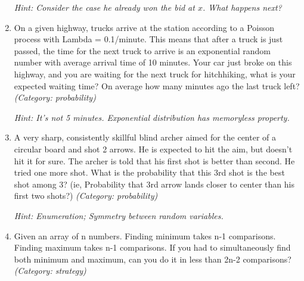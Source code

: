 \begin{enumerate}
\small\emph{Hint: Consider the case he already won the bid at $x$. What happens next?}





\item On a given highway, trucks arrive at the station according to a Poisson process with Lambda = 0.1/minute. This means that after a truck is just passed, the time for the next truck to arrive is an exponential random number with average arrival time of 10 minutes. Your car just broke on this highway, and you are waiting for the next truck for hitchhiking, what is your expected waiting time? On average how many minutes ago the last truck left?
\small\emph{(Category: probability)}

\small\emph{Hint: It's not 5 minutes. Exponential distribution has memoryless property.}





\item A very sharp, consistently skillful blind archer aimed for the center of a circular board and shot 2 arrows. He is expected to hit the aim, but doesn't hit it for sure. The archer is told that his first shot is better than second. He tried one more shot. What is the probability that this 3rd shot is the best shot among 3?
(ie, Probability that 3rd arrow lands closer to center than his first two shots?)
\small\emph{(Category: probability)}

\small\emph{Hint: Enumeration; Symmetry between random variables.}





\item Given an array of n numbers. Finding minimum takes n-1 comparisons. Finding maximum takes n-1 comparisons. If you had to simultaneously find both minimum and maximum, can you do it in less than 2n-2 comparisons?
\small\emph{(Category: strategy)}


\end{enumerate}
